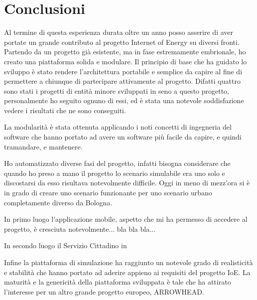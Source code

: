 \chapter{Conclusioni}

Al termine di questa esperienza durata oltre un anno posso asserire di aver portate un grande contributo al progetto Internet of Energy su diversi fronti. Partendo da un progetto già esistente, ma in fase estremamente embrionale, ho creato una piattaforma solida e modulare. Il principio di base che ha guidato lo sviluppo è stato rendere l'architettura portabile e semplice da capire al fine di permettere a chiunque di partecipare attivamente al progetto. Difatti quattro sono stati i progetti di entità minore sviluppati in seno a questo progetto, personalmente ho seguito ognuno di essi, ed è stata una notevole soddisfazione vedere i risultati che ne sono conseguiti.

La modularità è stata ottenuta applicando i noti concetti di ingegneria del software che hanno portato ad avere un software più facile da capire, e quindi tramandare, e mantenere. 

Ho automatizzato diverse fasi del progetto, infatti bisogna considerare che quando ho preso a mano il progetto lo scenario simulabile era uno solo e discostarsi da esso risultava notevolmente difficile. Oggi in meno di mezz'ora si è in grado di creare uno scenario funzionante per uno scenario urbano completamente diverso da Bologna. 

In primo luogo l'applicazione mobile, aspetto che mi ha permesso di accedere al progetto, è cresciuta notevolmente... bla bla bla...

In secondo luogo il Servizio Cittadino in 


Infine la piattaforma di simulazione ha raggiunto un notevole grado di realisticità e stabilità che hanno portato ad aderire appieno ai requisiti del progetto IoE. La maturità e la genericità della piattaforma sviluppata è tale che ha attirato l'interesse per un altro grande progetto europeo, ARROWHEAD. 







